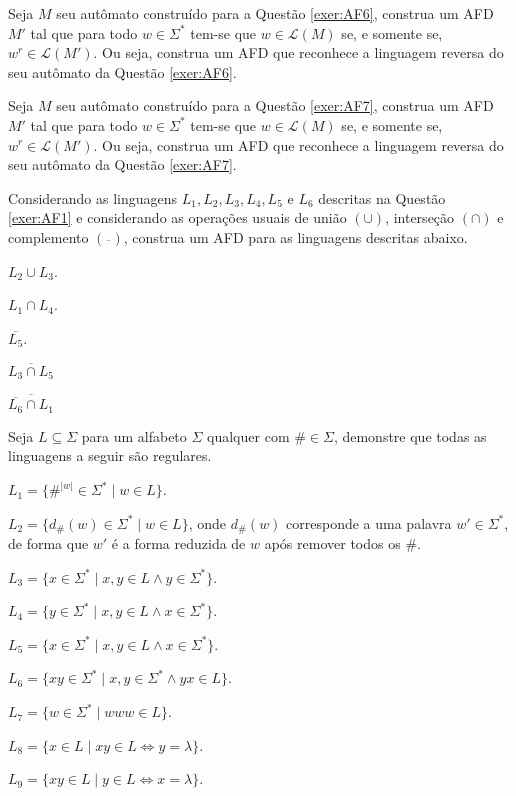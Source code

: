 \begin{questao}\label{exer:AF8}
	Seja $M$ seu autômato construído para a Questão \ref{exer:AF6}, construa um AFD $M'$ tal que para todo $w \in \Sigma^*$ tem-se que $w \in \mathcal{L}(M)$ se, e somente se, $w^r \in \mathcal{L}(M')$. Ou seja, construa um AFD que reconhece a linguagem reversa do seu autômato da Questão \ref{exer:AF6}.
\end{questao}

\begin{questao}\label{exer:AF9}
	Seja $M$ seu autômato construído para a Questão \ref{exer:AF7}, construa um AFD $M'$ tal que para todo $w \in \Sigma^*$ tem-se que $w \in \mathcal{L}(M)$ se, e somente se, $w^r \in \mathcal{L}(M')$. Ou seja, construa um AFD que reconhece a linguagem reversa do seu autômato da Questão \ref{exer:AF7}.
\end{questao}

\begin{questao}\label{exer:AF10}
	Considerando as linguagens $L_1, L_2, L_3, L_4, L_5$ e $L_6$ descritas na Questão \ref{exer:AF1} e considerando as operações usuais de união $(\cup)$, interseção $(\cap)$ e complemento $(\overline{ \ \ })$, construa um AFD para as linguagens descritas abaixo.
\end{questao}

\begin{exerList}
	\item $L_2 \cup L_3$.
	\item $L_1 \cap L_4$.
	\item $\overline{L_5}$.
	\item $\overline{L_3 \cap L_5}$
	\item $\overline{\overline{L_6} \cap L_1}$
\end{exerList}

\begin{questao}\label{exer:AFx}
	Seja $L \subseteq \Sigma$ para um alfabeto $\Sigma$ qualquer com $\# \in \Sigma$, demonstre que todas as linguagens a seguir são regulares.
\end{questao}

\begin{exerList}
	\item $L_1 = \{\#^{|w|} \in \Sigma^* \mid w \in L\}$.
	\item $L_2 = \{d_{\#}(w) \in \Sigma^* \mid w \in L\}$, onde $d_{\#}(w)$ corresponde a uma palavra $w' \in \Sigma^*$, de forma que $w'$ é a forma reduzida de $w$ após remover todos os $\#$.
	\item $L_3 = \{x \in \Sigma^* \mid x,y \in L \land y \in \Sigma^*\}$.
	\item $L_4 = \{y \in \Sigma^* \mid x,y \in L \land x \in \Sigma^*\}$.
	\item $L_5 = \{x \in \Sigma^* \mid x,y \in L \land x \in \Sigma^*\}$.
	\item $L_6 = \{xy \in \Sigma^* \mid x,y \in \Sigma^* \land yx \in L\}$.
	\item $L_7 = \{w \in \Sigma^* \mid www \in L\}$.
	\item $L_8 = \{x \in L \mid xy \in L \Longleftrightarrow y = \lambda\}$.
	\item $L_9 = \{xy \in L \mid y \in L \Longleftrightarrow x = \lambda\}$.
\end{exerList}